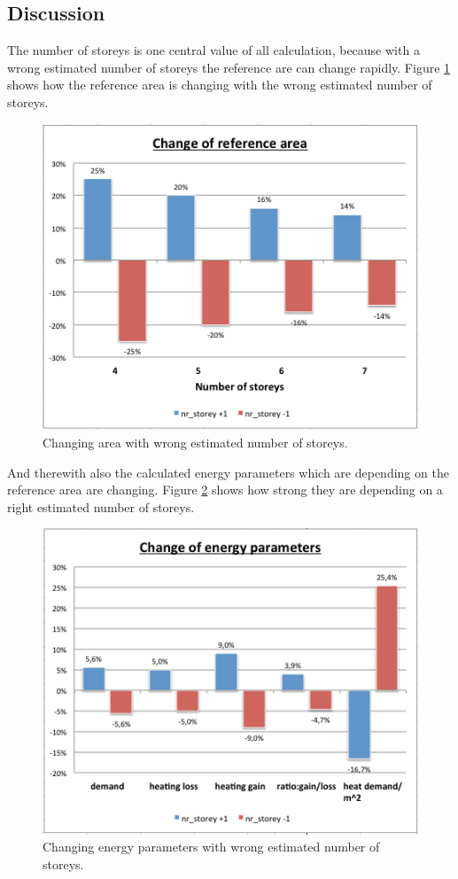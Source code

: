 \subsection{Discussion}
The number of storeys is one central value of all calculation, because with a wrong estimated number of storeys the reference are can change rapidly. Figure \ref{fig:changeArea} shows how the reference area is changing with the wrong estimated number of storeys.
\begin{figure}[h]
	\centering
 	 \includegraphics[scale=0.5]{phase2/group1/change_area.png} 
	\caption{Changing area with wrong estimated number of storeys.}
	 \label{fig:changeArea}
\end{figure}
And therewith also the calculated energy parameters which are depending on the reference area are changing.  Figure \ref{fig:changeParameter} shows how strong they are depending on a right estimated number of storeys.
\begin{figure}[h]
	\centering
 	 \includegraphics[scale=0.5]{phase2/group1/change_param.png} 
	\caption{Changing energy parameters with wrong estimated number of storeys.}
	 \label{fig:changeParameter}
\end{figure}

